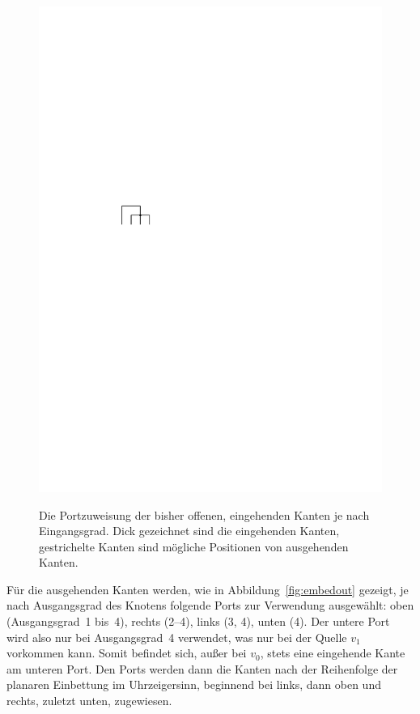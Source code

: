 \documentclass[a4paper]{scrreprt}
\theoremstyle{definition}
\begin{document}
\begin{figure}[h]
            {\includegraphics[scale=.8]{oc3_embed/incoming/indeg4}}

        \caption{Die Portzuweisung der bisher offenen, eingehenden Kanten je nach Eingangsgrad. Dick gezeichnet sind die eingehenden Kanten, gestrichelte Kanten sind mögliche Positionen von ausgehenden Kanten.}
        \label{fig:embedin}
\end{figure}

Für die ausgehenden Kanten werden, wie in Abbildung~\ref{fig:embedout} gezeigt, je nach Ausgangsgrad des Knotens folgende Ports zur Verwendung ausgewählt: oben (Ausgangsgrad~1 bis~4), rechts (2--4), links (3, 4), unten (4). Der untere Port wird also nur bei Ausgangsgrad~4 verwendet, was nur bei der Quelle $v_1$ vorkommen kann. Somit befindet sich, außer bei $v_0$, stets eine eingehende Kante am unteren Port. Den Ports werden dann die Kanten nach der Reihenfolge der planaren Einbettung im Uhrzeigersinn, beginnend bei links, dann oben und rechts, zuletzt unten, zugewiesen.
\end{document}
